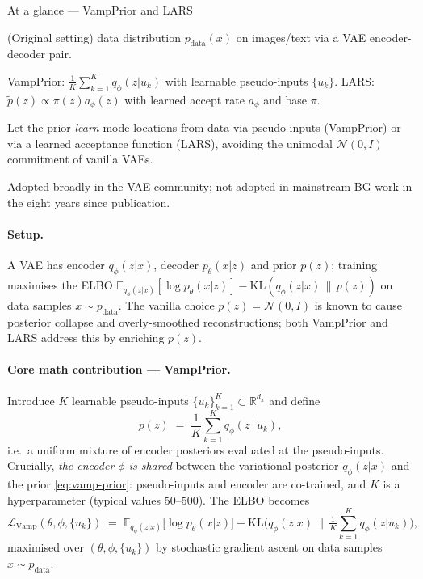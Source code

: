 \documentclass[11pt,letterpaper]{article}
\newcommand{\E}{\mathbb{E}}
\newcommand{\Real}{\mathbb{R}}
\newcommand{\KLdiv}{\mathrm{KL}}
\theoremstyle{plain}
\begin{document}
\begin{methodbox}{At a glance --- VampPrior and LARS}
\begin{description}[leftmargin=2.2em,style=nextline,itemsep=0pt,topsep=2pt]
  \item[Target] (Original setting) data distribution
    $p_{\mathrm{data}}(x)$ on images/text via a VAE encoder-decoder pair.
  \item[Prior] VampPrior: $\tfrac1K\sum_{k=1}^K q_\phi(z|u_k)$ with
    learnable pseudo-inputs $\{u_k\}$. LARS:
    $\tilde p(z)\propto\pi(z)a_\phi(z)$ with learned accept rate
    $a_\phi$ and base $\pi$.
  \item[New idea] Let the prior \emph{learn} mode locations from data via
    pseudo-inputs (VampPrior) or via a learned acceptance function
    (LARS), avoiding the unimodal $\mathcal N(0,I)$ commitment of vanilla
    VAEs.
  \item[Headline] Adopted broadly in the VAE community; not adopted in
    mainstream BG work in the eight years since publication.
\end{description}
\end{methodbox}

\paragraph{Setup.} A VAE has encoder $q_\phi(z|x)$, decoder
$p_\theta(x|z)$ and prior $p(z)$; training maximises the ELBO
\(
\E_{q_\phi(z|x)}[\log p_\theta(x|z)] - \KLdiv(q_\phi(z|x)\,\|\,p(z))
\)
on data samples $x\sim p_{\mathrm{data}}$. The vanilla choice
$p(z)=\mathcal N(0,I)$ is known to cause posterior collapse and
overly-smoothed reconstructions; both VampPrior and LARS address this by
enriching $p(z)$.

\paragraph{Core math contribution --- VampPrior.} Introduce $K$ learnable
pseudo-inputs $\{u_k\}_{k=1}^K\subset\Real^{d_x}$ and define
\begin{equation}\label{eq:vamp-prior}
  p(z) \;=\; \frac{1}{K}\sum_{k=1}^K q_\phi(z\,|\,u_k),
\end{equation}
i.e.\ a uniform mixture of encoder posteriors evaluated at the
pseudo-inputs. Crucially, \emph{the encoder $\phi$ is shared} between the
variational posterior $q_\phi(z|x)$ and the prior \eqref{eq:vamp-prior}:
pseudo-inputs and encoder are co-trained, and $K$ is a hyperparameter
(typical values $50$--$500$). The ELBO becomes
\begin{equation}\label{eq:vamp-loss}
  \mathcal L_{\mathrm{Vamp}}(\theta,\phi,\{u_k\}) \;=\; \E_{q_\phi(z|x)}\!\big[\log p_\theta(x|z)\big]
   - \KLdiv\!\Big(q_\phi(z|x)\,\Big\|\,\tfrac1K\textstyle\sum_{k=1}^K q_\phi(z|u_k)\Big),
\end{equation}
maximised over $(\theta,\phi,\{u_k\})$ by stochastic gradient ascent on
data samples $x\sim p_{\mathrm{data}}$.
\end{document}
